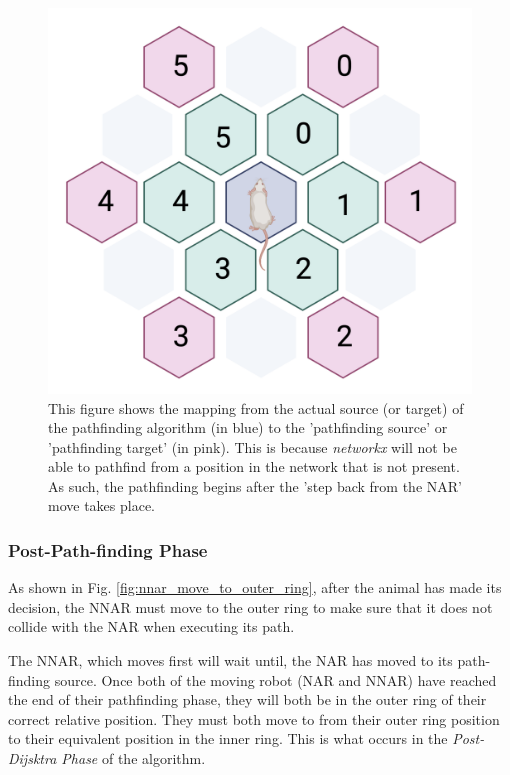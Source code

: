 \begin{figure}[h]
    \centering
    \includegraphics[scale=0.25]{images/pathfinding_source_target.png}
    \caption{This figure shows the mapping from the actual source (or target) of the pathfinding algorithm (in blue) to the 'pathfinding source' or 'pathfinding target'  (in pink). This is because \textit{networkx} will not be able to pathfind from a position in the network that is not present. As such, the pathfinding begins after the 'step back from the NAR' move takes place.}
    \label{fig:pathfinding_source_target_mapping}
\end{figure}

\subsubsection{Post-Path-finding Phase}
\label{section:post_path_finding}

As shown in Fig. \ref{fig:nnar_move_to_outer_ring}, after the animal has made its decision, the NNAR must move to the outer ring to make sure that it does not collide with the NAR when executing its path.

The NNAR, which moves first will wait until, the NAR has moved to its path-finding source. Once both of the moving robot (NAR and NNAR) have reached the end of their pathfinding phase, they will both be in the outer ring of their correct relative position. 
They must both move to from their outer ring position to their equivalent position in the inner ring. This is what occurs in the \textit{Post-Dijsktra Phase} of the algorithm. 

